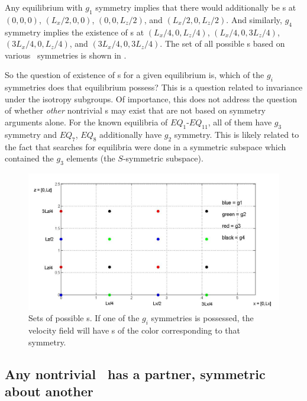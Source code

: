\documentclass[letter,12pt,openany]{article}
\begin{document}
Any equilibrium with $g_1$ symmetry implies that there would additionally 
be \stagp s at $(0,0,0)$, $(L_{x}/2,0,0)$, $(0,0,L_{z}/2)$, and 
$(L_{x}/2,0,L_{z}/2)$. And similarly, $g_4$ symmetry implies the 
existence of \stagp s at $(L_{x}/4,0,L_{z}/4)$, $(L_{x}/4,0,3L_{z}/4)$, 
$(3L_{x}/4,0,L_{z}/4)$, and $(3L_{x}/4,0,3L_{z}/4)$. The set of all 
possible {\stagp}s based on various \pCf\ symmetries is shown in 
. 

So the question of existence of \stagp s for a given equilibrium is, 
which of the $g_i$ symmetries does that equilibrium possess? This is a 
question related to invariance under the isotropy subgroups. Of 
importance, this does not address the question of whether \textit{other} 
nontrivial \stagp s may exist that are not based on symmetry arguments 
alone. For the known equilibria of {\pCf} $EQ_1$-$EQ_{11}$, all of them 
have $g_3$ symmetry and $EQ_7$, $EQ_8$ additionally have $g_2$ symmetry. 
This is likely related to the fact that searches for equilibria were done 
in a symmetric subspace which contained the $g_3$ elements (the 
$S$-symmetric subspace). 

\begin{figure}[!h]
\includegraphics[width=1.0\textwidth]{stags7_26.jpg}
  \caption{
   Sets of possible \stagp s. If one of the $g_i$ symmetries is
   possessed, the velocity field will have \stagp s of the color
   corresponding to that symmetry.
   }
  \label{fig:stags7_26}
 \end{figure}



\subsection{Any nontrivial \stagp\ has a partner, symmetric about another {\stagp}}
\end{document}
